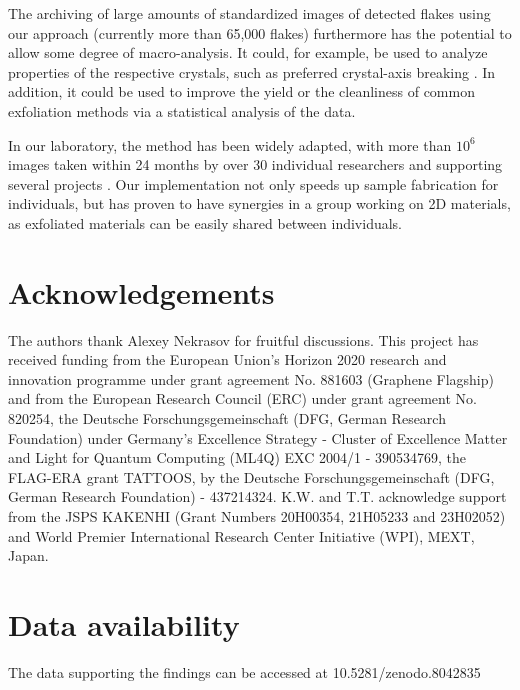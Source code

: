 \documentclass[reprint, prl, superscriptaddress, floatfix]{revtex4-2}
\begin{document}
The archiving of large amounts of standardized images of detected flakes using our approach (currently more than 65,000 flakes) furthermore has the potential to allow some degree of macro-analysis. 
It could, for example, be used to analyze properties of the respective crystals, such as preferred crystal-axis breaking \cite{Han2020Jul}. 
In addition, it could be used to improve the yield or the cleanliness of common exfoliation methods via a statistical analysis of the data. 

In our laboratory, the method has been widely adapted, with more than $10^6$ images taken within 24 months by over 30 individual researchers and supporting several projects \cite{Wirth2022, Tebbe2023, Ouaj2023}. 
Our implementation not only speeds up sample fabrication for individuals, but has proven to have synergies in a group working on 2D materials, as exfoliated materials can be easily shared between individuals. 
    
\section{Acknowledgements}
The authors thank Alexey Nekrasov for fruitful discussions. 
This project has received funding from the European Union’s Horizon 2020 research and innovation programme under grant agreement No. 881603 (Graphene Flagship) and from the European Research Council (ERC) under grant agreement No. 820254, the Deutsche Forschungsgemeinschaft (DFG, German Research Foundation) under Germany’s Excellence Strategy - Cluster of Excellence Matter and Light for Quantum Computing (ML4Q) EXC 2004/1 - 390534769, the FLAG-ERA grant TATTOOS, by the Deutsche Forschungsgemeinschaft (DFG, German Research Foundation) - 437214324. 
K.W. and T.T. acknowledge support from the JSPS KAKENHI (Grant Numbers 20H00354, 21H05233 and 23H02052) and World Premier International Research Center Initiative (WPI), MEXT, Japan.
 
\section{Data availability}
The data supporting the findings can be accessed at 10.5281/zenodo.8042835



\end{document}
